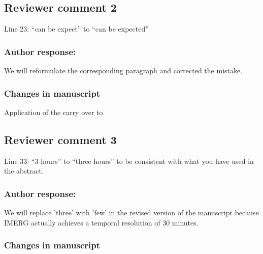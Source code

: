 \subsection*{Reviewer comment 2}

Line 23: “can be expect” to “can be expected”

\subsubsection*{Author response:}

We will reformulate the corresponding paragraph and corrected the mistake.

\subsubsection*{Changes in manuscript}

  \begin{change}[23]
     Application of the \DIFdelbegin {}\DIFdelend \DIFaddbegin {}\DIFaddend carry
    over to \DIFdelbegin {}\DIFdelend \DIFaddbegin {}\DIFaddend 
  \end{change}



\subsection*{Reviewer comment 3}

Line 33: “3 hours” to “three hours” to be consistent with what you have used in the abstract.

\subsubsection*{Author response:}

We will replace 'three' with 'few' in the revised version of the manuscript
because IMERG actually achieves a temporal resolution of 30 minutes.


\subsubsection*{Changes in manuscript}

